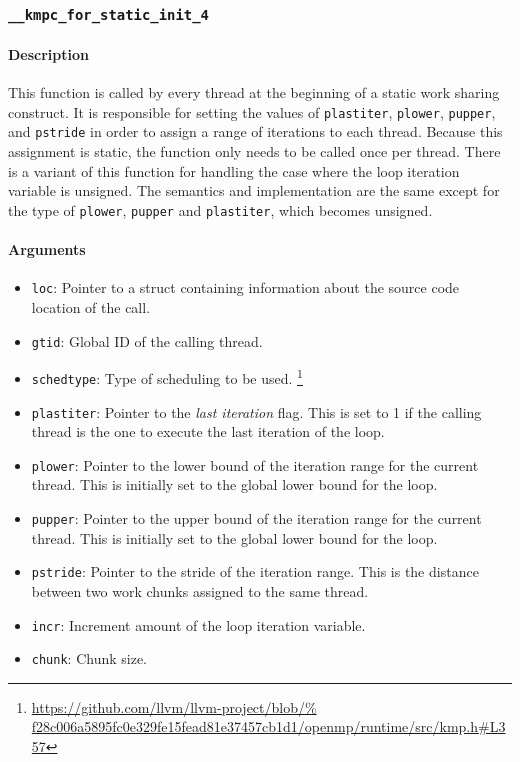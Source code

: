 \subsubsection{\texttt{\_\_kmpc\_for\_static\_init\_4}}

\paragraph{Description} This function is called by every thread at the beginning of a static work
sharing construct. It is responsible for setting the values of \texttt{plastiter}, \texttt{plower},
\texttt{pupper}, and \texttt{pstride} in order to assign a range of iterations to each thread.
Because this assignment is static, the function only needs to be called once per thread. There is a
variant of this function for handling the case where the loop iteration variable is unsigned. The
semantics and implementation are the same except for the type of \texttt{plower}, \texttt{pupper}
and \texttt{plastiter}, which becomes unsigned.

\paragraph{Arguments}
\begin{itemize}
	\item \texttt{loc}: Pointer to a struct containing information about the source code location
	      of the call.
	\item \texttt{gtid}: Global ID of the calling thread.
	\item \texttt{schedtype}: Type of scheduling to be used.
	      \footnote{\url{
			      https://github.com/llvm/llvm-project/blob/%
			      f28c006a5895fc0e329fe15fead81e37457cb1d1/openmp/runtime/src/kmp.h\#L357}}
	\item \texttt{plastiter}: Pointer to the \emph{last iteration} flag. This is set to 1 if the
	      calling thread is the one to execute the last iteration of the loop.
	\item \texttt{plower}: Pointer to the lower bound of the iteration range for the current thread.
	      This is initially set to the global lower bound for the loop.
	\item \texttt{pupper}: Pointer to the upper bound of the iteration range for the current thread.
	      This is initially set to the global lower bound for the loop.
	\item \texttt{pstride}: Pointer to the stride of the iteration range. This is the distance between
	      two work chunks assigned to the same thread.
	\item \texttt{incr}: Increment amount of the loop iteration variable.
	\item \texttt{chunk}: Chunk size.
\end{itemize}

